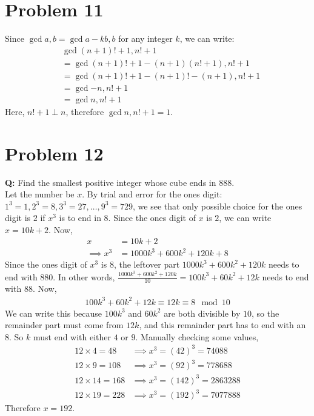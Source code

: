 \section*{Problem 11}
Since $\gcd{a,b} = \gcd{a-kb,b}$ for any integer $k$, we can write:
\begin{align*}
     & \gcd{(n+1)!+1, n!+1}                \\
     & =\gcd{(n+1)!+1 - (n+1)(n!+1), n!+1} \\
     & =\gcd{(n+1)!+1-(n+1)!-(n+1), n!+1}  \\
     & =\gcd{-n, n!+1}                     \\
     & =\gcd{n, n!+1}
\end{align*}
Here, $n!+1 \perp n$, therefore $\gcd{n, n!+1} = 1$.

\section*{Problem 12}
\textbf{Q: }Find the smallest positive integer whose cube ends in 888.\\

Let the number be $x$. By trial and error for the ones digit: $1^3=1, 2^3=8, 3^3=27, \ldots, 9^3=729$, we see that only possible choice for the ones digit is $2$ if $x^3$ is to end in $8$. Since the ones digit of $x$ is $2$, we can write $x=10k+2$. Now,
\begin{align*}
    x            & =10k+2                       \\
    \implies x^3 & =1000k^3 + 600k^2 + 120k + 8
\end{align*}
Since the ones digit of $x^3$ is $8$, the leftover part $1000k^3 + 600k^2+120k$ needs to end with $880$. In other words, $\frac{1000k^3 + 600k^2+120k}{10}=100k^3 + 60k^2+12k$ needs to end with $88$. Now,
\begin{align*}
    100k^3 + 60k^2 + 12k \equiv 12k \equiv 8 \mod{10}
\end{align*}
We can write this because $100k^3$ and $60k^2$ are both divisible by $10$, so the remainder part must come from $12k$, and this remainder part has to end with an $8$. So $k$ must end with either $4$ or $9$. Manually checking some values,
\begin{align*}
    12\times 4 = 48   & \implies x^3 = (42)^3 = 74088    \\
    12\times 9 = 108  & \implies x^3 = (92)^3 = 778688   \\
    12\times 14 = 168 & \implies x^3 = (142)^3 = 2863288 \\
    12\times 19 = 228 & \implies x^3 = (192)^3 = 7077888
\end{align*}
Therefore $x=192$.
\clearpage
